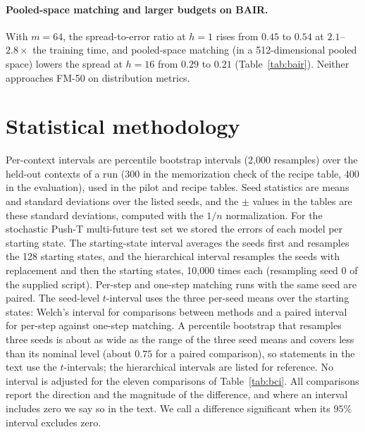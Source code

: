 \paragraph{Pooled-space matching and larger budgets on BAIR.}
With $m{=}64$, the spread-to-error ratio at $h{=}1$ rises from $0.45$ to $0.54$ at $2.1$--$2.8\times$ the training time, and pooled-space matching (in a 512-dimensional pooled space) lowers the spread at $h{=}16$ from $0.29$ to $0.21$ (Table~\ref{tab:bair}). Neither approaches FM-50 on distribution metrics.

\FloatBarrier
\section{Statistical methodology}
\label{app:stats}
Per-context intervals are percentile bootstrap intervals (2{,}000 resamples) over the held-out contexts of a run (300 in the memorization check of the recipe table, 400 in the evaluation), used in the pilot and recipe tables. Seed statistics are means and standard deviations over the listed seeds, and the $\pm$ values in the tables are these standard deviations, computed with the $1/n$ normalization. For the stochastic Push-T multi-future test set we stored the errors of each model per starting state. The starting-state interval averages the seeds first and resamples the 128 starting states, and the hierarchical interval resamples the seeds with replacement and then the starting states, 10{,}000 times each (resampling seed 0 of the supplied script). Per-step and one-step matching runs with the same seed are paired. The seed-level $t$-interval uses the three per-seed means over the starting states: Welch's interval for comparisons between methods and a paired interval for per-step against one-step matching. A percentile bootstrap that resamples three seeds is about as wide as the range of the three seed means and covers less than its nominal level (about $0.75$ for a paired comparison), so statements in the text use the $t$-intervals; the hierarchical intervals are listed for reference. No interval is adjusted for the eleven comparisons of Table~\ref{tab:bci}. All comparisons report the direction and the magnitude of the difference, and where an interval includes zero we say so in the text. We call a difference significant when its $95\%$ interval excludes zero.

\FloatBarrier
